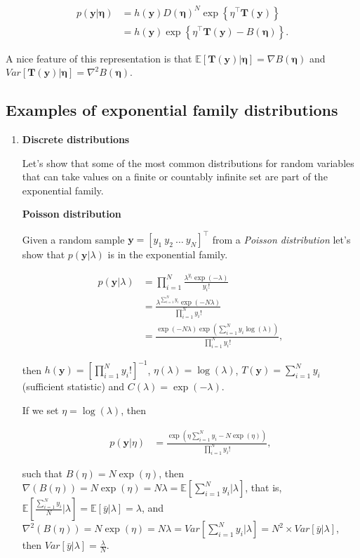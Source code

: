 \begin{align}
	p(\bm{y}|\bm{\eta})&=h(\bm{y})D(\bm{\eta})^N\exp\left\{\eta^{\top}\bm{T}(\bm{y})\right\}\nonumber\\
	&=h(\bm{y})\exp\left\{\eta^{\top}\bm{T}(\bm{y})-B(\bm{\eta})\right\}.\nonumber
\end{align}

A nice feature of this representation is that $\mathbb{E}[\bm{T}(\bm{y})|\bm{\eta}]=\nabla B(\bm{\eta})$ and $Var[\bm{T}(\bm{y})|\bm{\eta}]=\nabla^2 B(\bm{\eta})$. 

\subsection{Examples of exponential family distributions}

\begin{enumerate}

\item \textbf{Discrete distributions}

Let's show that some of the most common distributions for random variables that can take values on a finite or countably infinite set are part of the exponential family.
 
\textbf{Poisson distribution} 

Given a random sample $\bm{y}=[y_1 \ y_2 \ \dots \ y_N]^{\top}$ from a \textit{Poisson distribution} let's show that $p(\bm{y}|\lambda)$ is in the exponential family.

\begin{align}
	p(\bm{y}|\lambda)&=\prod_{i=1}^N \frac{\lambda^{y_i} \exp(-\lambda)}{y_i!}\nonumber\\
	&=\frac{\lambda^{\sum_{i=1}^N y_i}\exp(-N\lambda)}{\prod_{i=1}^N y_i!}\nonumber\\
	&=\frac{\exp(-N\lambda)\exp(\sum_{i=1}^Ny_i\log(\lambda))}{\prod_{i=1}^N y_i!}\nonumber,
\end{align}

then $h(\bm{y})=\left[\prod_{i=1}^N y_i!\right]^{-1}$, $\eta(\lambda)=\log(\lambda)$, $T(\bm{y})=\sum_{i=1}^N y_i$ (sufficient statistic) and $C(\lambda)=\exp(-\lambda)$.

If we set $\eta=\log(\lambda)$, then 

\begin{align}
	p(\bm{y}|\eta)&=\frac{\exp(\eta\sum_{i=1}^Ny_i-N\exp(\eta))}{\prod_{i=1}^N y_i!},\nonumber
\end{align}

such that $B(\eta)=N\exp(\eta)$, then $\nabla(B(\eta))=N\exp(\eta)=N\lambda=\mathbb{E}\left[\sum_{i=1}^N y_i\biggr\rvert\lambda\right]$, that is, $\mathbb{E}\left[\frac{\sum_{i=1}^N y_i}{N}\biggr\rvert\lambda\right]=\mathbb{E}[\bar{y}|\lambda]=\lambda$, and $\nabla^2(B(\eta))=N\exp(\eta)=N\lambda=Var\left[\sum_{i=1}^N y_i\biggr\rvert\lambda\right]=N^2 \times Var\left[\bar{y}\rvert\lambda\right]$, then $Var\left[\bar{y}\rvert\lambda\right]=\frac{\lambda}{N}$.\\ 


\end{enumerate}
